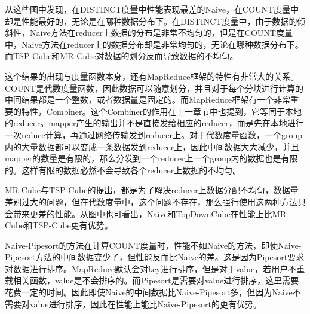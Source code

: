 从这些图中发现，在DISTINCT度量中性能表现最差的Naive，在COUNT度量中却是性能最好的，无论是在哪种数据分布下。在DISTINCT度量中，由于数据的倾斜性，Naive方法在reducer上数据的分布是非常不均匀的，但是在COUNT度量中，Naive方法在reducer上的数据分布却是非常均匀的，无论在哪种数据分布下。而TSP-Cube和MR-Cube对数据的划分反而导致数据的不均匀。

这个结果的出现与度量函数本身，还有MapReduce框架的特性有非常大的关系。COUNT是代数度量函数，因此数据可以随意划分，并且对于每个分块进行计算的中间结果都是一个整数，或者数据量是固定的。而MapReduce框架有一个非常重要的特性，Combiner。这个Combiner的作用在上一章节中也提到，它等同于本地的reducer。mapper产生的输出并不是直接发给相应的reducer，而是先在本地进行一次reduce计算，再通过网络传输发到reducer上。对于代数度量函数，一个group内的大量数据都可以变成一条数据发到reducer上，因此中间数据大大减少，并且mapper的数量是有限的，那么分发到一个reducer上一个group内的数据也是有限的。这样有限的数据必然不会导致各个reducer上数据的不均匀。

MR-Cube与TSP-Cube的提出，都是为了解决reducer上数据分配不均匀，数据量差别过大的问题，但在代数度量中，这个问题不存在，那么强行使用这两种方法只会带来更差的性能。从图中也可看出，Naive和TopDownCube在性能上比MR-Cube和TSP-Cube更有优势。

Naive-Pipesort的方法在计算COUNT度量时，性能不如Naive的方法，即使Naive-Pipesort方法的中间数据变少了，但性能反而比Naive的差。这是因为Pipesort要求对数据进行排序。MapReduce默认会对key进行排序，但是对于value，若用户不重载相关函数，value是不会排序的。而Pipesort是需要对value进行排序，这里需要花费一定的时间。因此即使Naive的中间数据比Naive-Pipesort多，但因为Naive不需要对value进行排序，因此在性能上能比Naive-Pipesort的更有优势。

